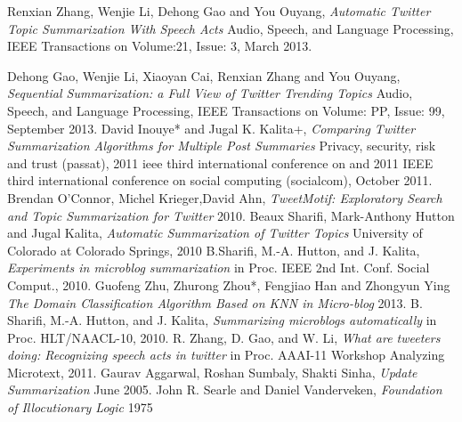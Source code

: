 \documentclass[conference]{IEEEtran}
\begin{document}
\begin{thebibliography}{1}

  Renxian Zhang, Wenjie Li, Dehong Gao and You Ouyang, \emph{Automatic Twitter Topic Summarization With Speech Acts} Audio, Speech, and Language Processing, IEEE Transactions on  Volume:21,  Issue: 3, March 2013. 

Dehong Gao, Wenjie Li, Xiaoyan Cai, Renxian Zhang and You Ouyang, \emph{Sequential Summarization: a Full View of Twitter Trending Topics} Audio, Speech, and Language Processing, IEEE Transactions on  Volume: PP,  Issue: 99, September 2013. 
David Inouye* and Jugal K. Kalita+, \emph{Comparing Twitter Summarization Algorithms for Multiple Post Summaries} Privacy, security, risk and trust (passat), 2011 ieee third international conference on and 2011 IEEE third international conference on social computing (socialcom), October 2011.
Brendan O’Connor, Michel Krieger,David Ahn, \emph{TweetMotif: Exploratory Search and Topic Summarization for Twitter} 2010.
Beaux Sharifi, Mark-Anthony Hutton and Jugal Kalita, \emph{Automatic Summarization of Twitter Topics} University of Colorado at Colorado Springs, 2010
B.Sharifi, M.-A. Hutton, and J. Kalita,  \emph{Experiments in microblog summarization} in Proc. IEEE 2nd Int. Conf. Social Comput., 2010.
Guofeng Zhu, Zhurong Zhou*, Fengjiao Han and Zhongyun Ying \emph{The Domain Classification Algorithm Based on KNN in Micro-blog} 2013.
B. Sharifi, M.-A. Hutton, and J. Kalita, \emph{Summarizing microblogs automatically} in Proc. HLT/NAACL-10, 2010.
 R. Zhang, D. Gao, and W. Li, \emph{What are tweeters doing: Recognizing speech acts in twitter} in Proc. AAAI-11 Workshop Analyzing Microtext, 2011. 
Gaurav Aggarwal, Roshan Sumbaly, Shakti Sinha, \emph{Update Summarization} June 2005.
John R. Searle and Daniel Vanderveken, \emph{Foundation of Illocutionary Logic} 1975
\end{thebibliography}
\end{document}
